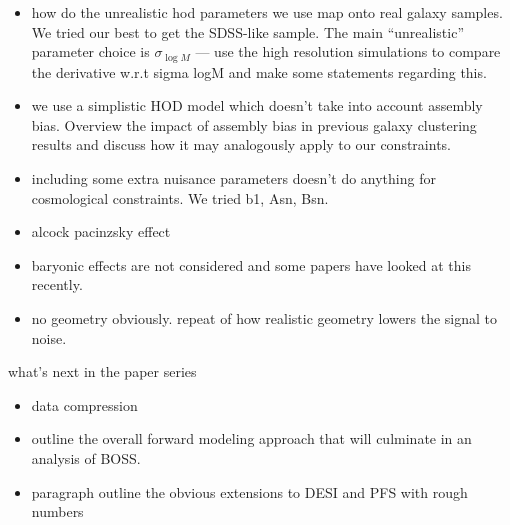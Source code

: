 \begin{itemize}
    \item how do the unrealistic hod parameters we use map onto real galaxy
        samples. We tried our best to get the SDSS-like sample. The main
        ``unrealistic'' parameter choice is $\sigma_{\log M}$ --- use the
        high resolution simulations to compare the derivative w.r.t sigma logM
        and make some statements regarding this. 
    \item we use a simplistic HOD model which doesn't take into account
        assembly bias. Overview the impact of assembly bias in previous galaxy
        clustering results and discuss how it may analogously apply to our
        constraints.
    \item including some extra nuisance parameters doesn't do anything for
        cosmological constraints. We tried b1, Asn, Bsn.  
    \item alcock pacinzsky effect
    \item baryonic effects are not considered and some papers have looked at
        this recently. 
    \item no geometry obviously. repeat of how realistic geometry lowers the
        signal to noise. 
\end{itemize}

what's next in the paper series 
\begin{itemize}
    \item data compression 
    \item outline the overall forward modeling approach that will culminate in
        an analysis of BOSS. 
    \item paragraph outline the obvious extensions to DESI and PFS with rough
        numbers 
\end{itemize}
